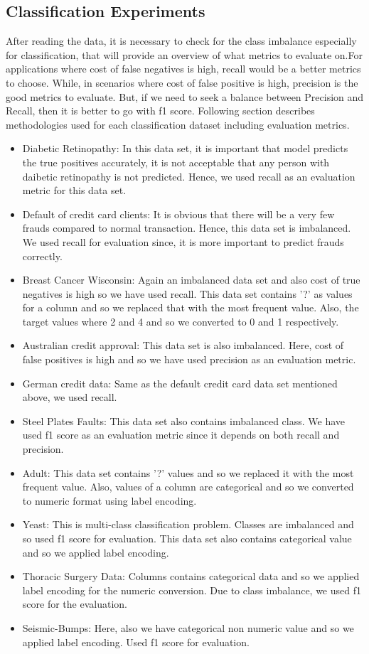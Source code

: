 \documentclass[10pt,twocolumn,letterpaper]{article}
\begin{document}
\subsection{Classification Experiments}
After reading the data, it is necessary to check for the class imbalance especially for classification, that will provide an overview of what metrics to evaluate on.For applications where cost of false negatives is high, recall would be a better metrics to choose. While, in scenarios where cost of false positive is high, precision is the good metrics to evaluate. But, if we need to seek a balance between Precision and Recall, then it is better to go with f1 score. Following section describes methodologies used for each classification dataset including evaluation metrics.
\begin{itemize}
    \item Diabetic Retinopathy: In this data set, it is important that model predicts the true positives accurately, it is not acceptable that any person with daibetic retinopathy is not predicted. Hence, we used recall as an evaluation metric for this data set.    
    \item Default of credit card clients: It is obvious that there will be a very few frauds compared to normal transaction. Hence, this data set is imbalanced. We used recall for evaluation since, it is more important to predict frauds correctly. 
    \item Breast Cancer Wisconsin: Again an imbalanced data set and also cost of true negatives is high so we have used recall. This data set contains '?' as values for a column and so we replaced that with the most frequent value. Also, the target values where 2 and 4 and so we converted to 0 and 1 respectively.  
    \item Australian credit approval: This data set is also imbalanced. Here, cost of false positives is high and so we have used precision as an evaluation metric. 
    \item German credit data: Same as the default credit card data set mentioned above, we used recall.
    \item Steel Plates Faults: This data set also contains imbalanced class. We have used f1 score as an evaluation metric since it depends on both recall and precision.
    \item Adult: This data set contains '?' values and so we replaced it with the most frequent value. Also, values of a column are categorical and so we converted to numeric format using label encoding. 
    \item Yeast: This is multi-class classification problem. Classes are imbalanced and so used f1 score for evaluation. This data set also contains categorical value and so we applied label encoding.
    \item Thoracic Surgery Data: Columns contains categorical data and so we applied label encoding for the numeric conversion. Due to class imbalance, we used f1 score for the evaluation.
    \item Seismic-Bumps: Here, also we have categorical non numeric value and so we applied label encoding. Used f1 score for evaluation.
\end{itemize}
\end{document}
